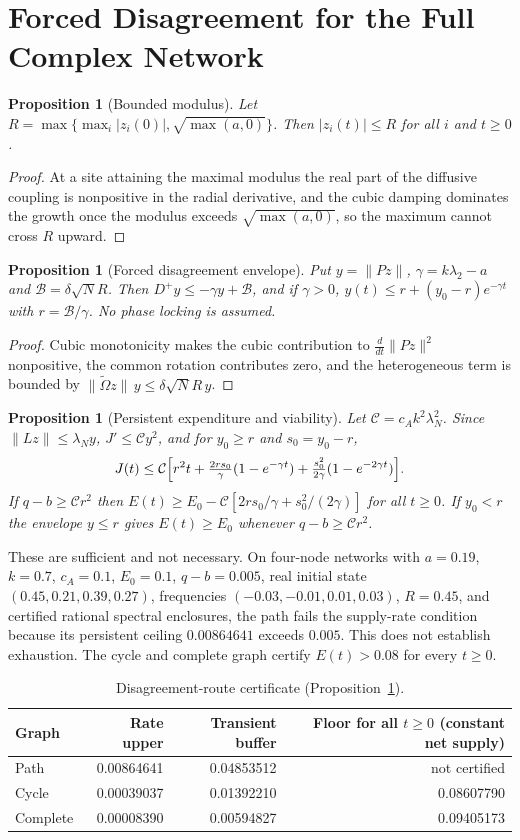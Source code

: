 \documentclass[11pt,notitlepage]{report}
\newtheorem{proposition}[theorem]{Proposition}
\theoremstyle{definition}
\theoremstyle{remark}
\begin{document}
\section{Forced Disagreement for the Full Complex Network}
\begin{proposition}[Bounded modulus]\label{prop:modulus}
Let $R=\max\{\max_i|z_i(0)|,\sqrt{\max(a,0)}\}$. Then $|z_i(t)|\le R$ for all $i$ and $t\ge0$.
\end{proposition}
\begin{proof}
At a site attaining the maximal modulus the real part of the diffusive coupling is nonpositive in the radial derivative, and the cubic damping dominates the growth once the modulus exceeds $\sqrt{\max(a,0)}$, so the maximum cannot cross $R$ upward.
\end{proof}
\begin{proposition}[Forced disagreement envelope]\label{prop:forced}
Put $y=\|Pz\|$, $\gamma=k\lambda_2-a$ and $\mathcal B=\delta\sqrt NR$. Then $D^+y\le-\gamma y+\mathcal B$, and if $\gamma>0$, $y(t)\le r+(y_0-r)e^{-\gamma t}$ with $r=\mathcal B/\gamma$. No phase locking is assumed.
\end{proposition}
\begin{proof}
Cubic monotonicity makes the cubic contribution to $\tfrac{d}{dt}\|Pz\|^2$ nonpositive, the common rotation contributes zero, and the heterogeneous term is bounded by $\|\tilde\Omega z\|\,y\le\delta\sqrt NR\,y$.
\end{proof}
\begin{proposition}[Persistent expenditure and viability]\label{prop:persistent}
Let $\mathcal C=c_Ak^2\lambda_N^2$. Since $\|Lz\|\le\lambda_Ny$, $J'\le\mathcal Cy^2$, and for $y_0\ge r$ and $s_0=y_0-r$,
\[
J(t)\le\mathcal C\Bigl[r^2t+\tfrac{2rs_0}{\gamma}(1-e^{-\gamma t})+\tfrac{s_0^2}{2\gamma}(1-e^{-2\gamma t})\Bigr].
\]
If $q-b\ge\mathcal Cr^2$ then $E(t)\ge E_0-\mathcal C[2rs_0/\gamma+s_0^2/(2\gamma)]$ for all $t\ge0$. If $y_0<r$ the envelope $y\le r$ gives $E(t)\ge E_0$ whenever $q-b\ge\mathcal Cr^2$.
\end{proposition}
These are sufficient and not necessary. On four-node networks with $a=0.19$, $k=0.7$, $c_A=0.1$, $E_0=0.1$, $q-b=0.005$, real initial state $(0.45,0.21,0.39,0.27)$, frequencies $(-0.03,-0.01,0.01,0.03)$, $R=0.45$, and certified rational spectral enclosures, the path fails the supply-rate condition because its persistent ceiling $0.00864641$ exceeds $0.005$. This does not establish exhaustion. The cycle and complete graph certify $E(t)>0.08$ for every $t\ge0$.
\begin{table}[ht]\centering\small
\caption{Disagreement-route certificate (Proposition~\ref{prop:persistent}).}
\begin{tabular}{lrrr}\toprule
Graph&Rate upper&Transient buffer&Floor for all $t\ge0$ (constant net supply)\\\midrule
Path&0.00864641&0.04853512&not certified\\
Cycle&0.00039037&0.01392210&0.08607790\\
Complete&0.00008390&0.00594827&0.09405173\\\bottomrule
\end{tabular}
\end{table}
\end{document}

